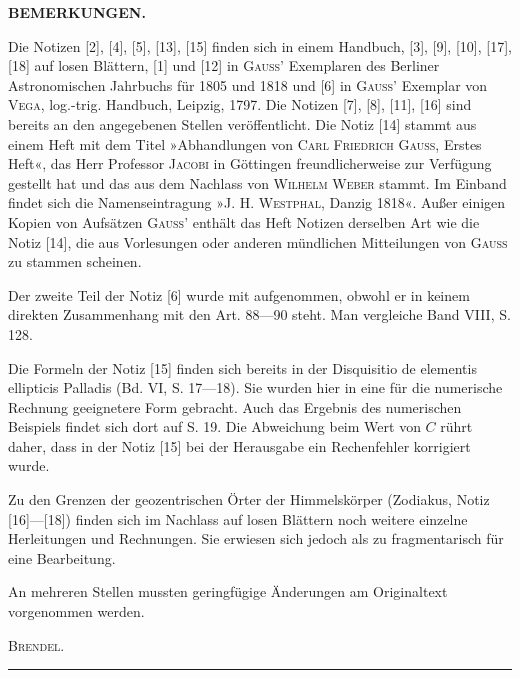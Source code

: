 \clearpage
{}
\begin{center}
\textbf{BEMERKUNGEN.}
\end{center}

Die Notizen [2], [4], [5], [13], [15] finden sich in einem Handbuch, [3], [9], [10], [17], [18] auf losen Blättern, [1] und [12] in \textsc{Gauss}’ Exemplaren des Berliner Astronomischen Jahrbuchs für 1805 und 1818 und [6] in \textsc{Gauss}’ Exemplar von \textsc{Vega}, log.-trig. Handbuch, Leipzig, 1797. Die Notizen [7], [8], [11], [16] sind bereits an den angegebenen Stellen veröffentlicht. Die Notiz [14] stammt aus einem Heft mit dem Titel »Abhandlungen von \textsc{Carl Friedrich Gauss}, Erstes Heft«, das Herr Professor \textsc{Jacobi} in Göttingen freundlicherweise zur Verfügung gestellt hat und das aus dem Nachlass von \textsc{Wilhelm Weber} stammt. Im Einband findet sich die Namenseintragung »\textsc{J. H. Westphal}, Danzig 1818«. Außer einigen Kopien von Aufsätzen \textsc{Gauss}’ enthält das Heft Notizen derselben Art wie die Notiz [14], die aus Vorlesungen oder anderen mündlichen Mitteilungen von \textsc{Gauss} zu stammen scheinen.

Der zweite Teil der Notiz [6] wurde mit aufgenommen, obwohl er in keinem direkten Zusammenhang mit den Art. 88---90 steht. Man vergleiche Band VIII, S. 128.

Die Formeln der Notiz [15] finden sich bereits in der Disquisitio de elementis ellipticis Palladis (Bd. VI, S. 17---18). Sie wurden hier in eine für die numerische Rechnung geeignetere Form gebracht. Auch das Ergebnis des numerischen Beispiels findet sich dort auf S. 19. Die Abweichung beim Wert von \(C\) rührt daher, dass in der Notiz [15] bei der Herausgabe ein Rechenfehler korrigiert wurde.

Zu den Grenzen der geozentrischen Örter der Himmelskörper (Zodiakus, Notiz [16]---[18]) finden sich im Nachlass auf losen Blättern noch weitere einzelne Herleitungen und Rechnungen. Sie erwiesen sich jedoch als zu fragmentarisch für eine Bearbeitung.

An mehreren Stellen mussten geringfügige Änderungen am Originaltext vorgenommen werden.
\begin{flushright}
\textsc{Brendel}.
\end{flushright}
\begin{center}
\rule{0.3\linewidth}{0.4pt}
\end{center}
